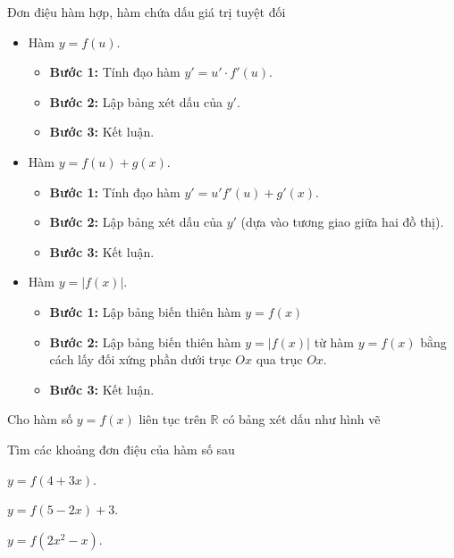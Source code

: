 \begin{dang}{Đơn điệu hàm hợp, hàm chứa dấu giá trị tuyệt đối}
    \begin{itemize}
        \item Hàm $y=f(u)$.
        \begin{itemize}
            \item \textbf{Bước 1:} Tính đạo hàm $y'=u'\cdot f'(u)$.
            \item \textbf{Bước 2:} Lập bảng xét dấu của $y'$.
            \item \textbf{Bước 3:} Kết luận.
        \end{itemize}
        \item Hàm $y=f(u)+g(x)$.
        \begin{itemize}
            \item \textbf{Bước 1:} Tính đạo hàm $y'=u'f'(u)+g'(x)$.
            \item \textbf{Bước 2:} Lập bảng xét dấu của $y'$ (dựa vào tương giao giữa hai đồ thị).
            \item \textbf{Bước 3:} Kết luận.
        \end{itemize}
        \item Hàm $y=|f(x)|$.
        \begin{itemize}
            \item \textbf{Bước 1:} Lập bảng biến thiên hàm $y=f(x)$
            \item \textbf{Bước 2:} Lập bảng biến thiên hàm $y=|f(x)|$ từ hàm $y=f(x)$ bằng cách lấy đối xứng phần dưới trục $Ox$ qua trục $Ox$.
            \item \textbf{Bước 3:} Kết luận.
        \end{itemize}
    \end{itemize}
\end{dang}
\begin{vd}%
    Cho hàm số $y=f(x)$ liên tục trên $\mathbb{R}$ có bảng xét dấu như hình vẽ
    \begin{center}
    \end{center}
    Tìm các khoảng đơn điệu của hàm số sau
    \begin{listEX}[3]
        \item $y=f(4+3x)$.
        \item $y=f(5-2x)+3$.
        \item $y=f(2x^2-x)$.
    \end{listEX}
\end{vd}
